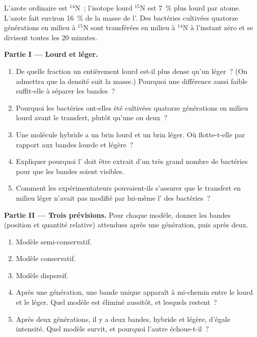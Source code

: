 \begin{problem}
\label{pb:g11:dna-replication:1}
L'azote ordinaire est $^{14}$N~; l'isotope lourd $^{15}$N est 7~\% plus
lourd par atome. L'azote fait environ 16~\% de la masse de l'. Des
bactéries cultivées quatorze générations en milieu à $^{15}$N sont
transférées en milieu à $^{14}$N à l'instant zéro et se divisent toutes
les 20 minutes.

\medskip
\noindent\textbf{Partie I --- Lourd et léger.}
\begin{enumerate}
  \item De quelle fraction un  entièrement lourd est-il plus dense
        qu'un  léger~? (On admettra que la densité suit la masse.)
        Pourquoi une différence aussi faible suffit-elle à séparer les
        bandes~?
  \item Pourquoi les bactéries ont-elles été cultivées quatorze
        générations en milieu lourd avant le transfert, plutôt qu'une
        ou deux~?
  \item Une molécule hybride a un brin lourd et un brin léger. Où
        flotte-t-elle par rapport aux bandes lourde et légère~?
  \item Expliquer pourquoi l' doit être extrait d'un très grand
        nombre de bactéries pour que les bandes soient visibles.
  \item Comment les expérimentateurs pouvaient-ils s'assurer que le
        transfert en milieu léger n'avait pas modifié par lui-même
        l' des bactéries~?
\end{enumerate}

\medskip
\noindent\textbf{Partie II --- Trois prévisions.}
Pour chaque modèle, donner les bandes (position et quantité relative)
attendues après une génération, puis après deux.
\begin{enumerate}[resume]
  \item Modèle semi-conservatif.
  \item Modèle conservatif.
  \item Modèle dispersif.
  \item Après une génération, une bande unique apparaît à mi-chemin
        entre le lourd et le léger. Quel modèle est éliminé
        aussitôt, et lesquels restent~?
  \item Après deux générations, il y a deux bandes, hybride et légère,
        d'égale intensité. Quel modèle survit, et pourquoi l'autre
        échoue-t-il~?
\end{enumerate}


\end{problem}
